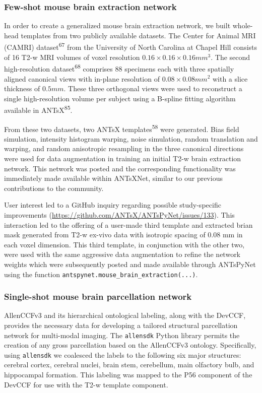 \documentclass[
  12pt,
]{article}
\begin{document}
\subsubsection{Few-shot mouse brain extraction
network}\label{few-shot-mouse-brain-extraction-network}

In order to create a generalized mouse brain extraction network, we
built whole-head templates from two publicly available datasets. The
Center for Animal MRI (CAMRI) dataset\textsuperscript{67} from the
University of North Carolina at Chapel Hill consists of 16 T2-w MRI
volumes of voxel resolution \(0.16
\times 0.16 \times 0.16 mm^3\). The second high-resolution
dataset\textsuperscript{68} comprises 88 specimens each with three
spatially aligned canonical views with in-plane resolution of
\(0.08 \times 0.08 mm^2\) with a slice thickness of \(0.5 mm\). These
three orthogonal views were used to reconstruct a single high-resolution
volume per subject using a B-spline fitting algorithm available in
ANTsX\textsuperscript{85}.

From these two datasets, two ANTsX templates\textsuperscript{58} were
generated. Bias field simulation, intensity histogram warping, noise
simulation, random translation and warping, and random anisotropic
resampling in the three canonical directions were used for data
augmentation in training an initial T2-w brain extraction network. This
network was posted and the corresponding functionality was immediately
made available within ANTsXNet, similar to our previous contributions to
the community.

User interest led to a GitHub inquiry regarding possible study-specific
improvements (\url{https://github.com/ANTsX/ANTsPyNet/issues/133}). This
interaction led to the offering of a user-made third template and
extracted brian mask generated from T2-w ex-vivo data with isotropic
spacing of 0.08 mm in each voxel dimension. This third template, in
conjunction with the other two, were used with the same aggressive data
augmentation to refine the network weights which were subsequently
posted and made available through ANTsPyNet using the function
\texttt{antspynet.mouse\_brain\_extraction(...)}.

\subsubsection{Single-shot mouse brain parcellation
network}\label{single-shot-mouse-brain-parcellation-network}

AllenCCFv3 and its hierarchical ontological labeling, along with the
DevCCF, provides the necessary data for developing a tailored structural
parcellation network for multi-modal imaging. The \texttt{allensdk}
Python library permits the creation of any gross parcellation based on
the AllenCCFv3 ontology. Specifically, using \texttt{allensdk} we
coalesced the labels to the following six major structures: cerebral
cortex, cerebral nuclei, brain stem, cerebellum, main olfactory bulb,
and hippocampal formation. This labeling was mapped to the P56 component
of the DevCCF for use with the T2-w template component.
\end{document}
